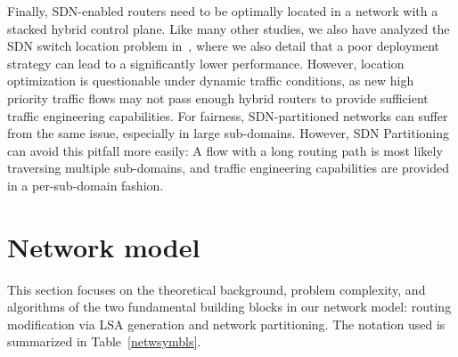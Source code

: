 \documentclass[journal]{IEEEtran}
\begin{document}
\par Finally, SDN-enabled routers need to be optimally located in a network with a stacked hybrid control plane. Like many other studies, we also have analyzed the SDN switch location problem in~\cite{hybrid_2}, where we also detail that a poor deployment strategy can lead to a significantly lower performance. However, location optimization is questionable under dynamic traffic conditions, as new high priority traffic flows may not pass enough hybrid routers to provide sufficient traffic engineering capabilities. For fairness, SDN-partitioned networks can suffer from the same issue, especially in large sub-domains. However, SDN Partitioning can avoid this pitfall more easily: A flow with a long routing path is most likely traversing multiple sub-domains, and traffic engineering capabilities are provided in a per-sub-domain fashion.


















\section{Network model}\label{math_section}
\par This section focuses on the theoretical background, problem complexity, and algorithms of the two fundamental building blocks in our network model: routing modification via LSA generation and network partitioning. The notation used is summarized in Table~\ref{netwsymbls}. 
\end{document}
